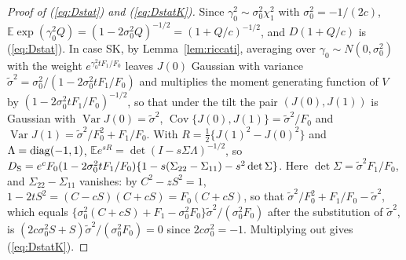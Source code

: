 \documentclass[ecta,nameyear,final]{econsocart}
\newcommand{\E}{{\mathbb E}}
\newcommand{\Var}{\operatorname{Var}}
\newcommand{\Cov}{\operatorname{Cov}}
\newcommand{\Sk}{\textsf{\upshape SK}}
\theoremstyle{plain}
\theoremstyle{definition}
\begin{document}
\begin{appendix}
\begin{proof}[Proof of (\ref{eq:Dstat}) and (\ref{eq:DstatK})]
Since $\gamma_0^2\sim\sigma_0^2\chi^2_1$ with $\sigma_0^2=-1/(2c)$, $\E\exp(\gamma_0^2Q)=(1-2\sigma_0^2Q)^{-1/2}=(1+Q/c)^{-1/2}$, and $D(1+Q/c)$ is (\ref{eq:Dstat}).  In case \Sk, by Lemma~\ref{lem:riccati}, averaging over $\gamma_0\sim N(0,\sigma_0^2)$ with the weight $e^{\gamma_0^2tF_1/F_0}$ leaves $J(0)$ Gaussian with variance $\tilde\sigma^2=\sigma_0^2/(1-2\sigma_0^2tF_1/F_0)$ and multiplies the moment generating function of $V$ by $(1-2\sigma_0^2tF_1/F_0)^{-1/2}$, so that under the tilt the pair $(J(0),J(1))$ is Gaussian with $\Var J(0)=\tilde\sigma^2$, $\Cov\{J(0),J(1)\}=\tilde\sigma^2/F_0$ and $\Var J(1)=\tilde\sigma^2/F_0^2+F_1/F_0$.  With $R=\frac12\{J(1)^2-J(0)^2\}$ and $\Lambda={\rm diag}(-1,1)$, $\E e^{sR}=\det(I-s\Sigma\Lambda)^{-1/2}$, so $D_{\rm S}=e^cF_0(1-2\sigma_0^2tF_1/F_0)\{1-s(\Sigma_{22}-\Sigma_{11})-s^2\det\Sigma\}$.  Here $\det\Sigma=\tilde\sigma^2F_1/F_0$, and $\Sigma_{22}-\Sigma_{11}$ vanishes: by $C^2-zS^2=1$, $1-2tS^2=(C-cS)(C+cS)=F_0(C+cS)$, so that $\tilde\sigma^2/F_0^2+F_1/F_0-\tilde\sigma^2$, which equals $\{\sigma_0^2(C+cS)+F_1-\sigma_0^2F_0\}\tilde\sigma^2/(\sigma_0^2F_0)$ after the substitution of $\tilde\sigma^2$, is $(2c\sigma_0^2S+S)\tilde\sigma^2/(\sigma_0^2F_0)=0$ since $2c\sigma_0^2=-1$.  Multiplying out gives (\ref{eq:DstatK}).
\end{proof}
\end{appendix}



\end{document}
